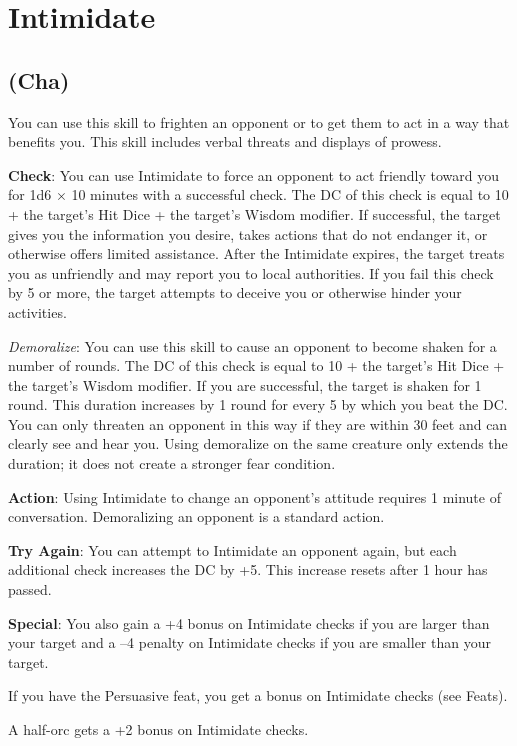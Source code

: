 \section{Intimidate}

\label{f0}
\subsection{(Cha)}

				
You can use this skill to frighten an opponent or to get them to act in a way that benefits you. This skill includes verbal threats and displays of prowess.
				
\textbf{Check}: You can use Intimidate to force an opponent to act friendly toward you for 1d6 \mbox{$\times$} 10 minutes with a successful check. The DC of this check is equal to 10 + the target's Hit Dice + the target's Wisdom modifier. If successful, the target gives you the information you desire, takes actions that do not endanger it, or otherwise offers limited assistance. After the Intimidate expires, the target treats you as unfriendly and may report you to local authorities. If you fail this check by 5 or more, the target attempts to deceive you or otherwise hinder your activities.
				
\emph{Demoralize}: You can use this skill to cause an opponent to become shaken for a number of rounds. The DC of this check is equal to 10 + the target's Hit Dice + the target's Wisdom modifier. If you are successful, the target is shaken for 1 round. This duration increases by 1 round for every 5 by which you beat the DC. You can only threaten an opponent in this way if they are within 30 feet and can clearly see and hear you. Using demoralize on the same creature only extends the duration; it does not create a stronger fear condition.
				
\textbf{Action}: Using Intimidate to change an opponent's attitude requires 1 minute of conversation. Demoralizing an opponent is a standard action.
				
\textbf{Try Again}: You can attempt to Intimidate an opponent again, but each additional check increases the DC by +5. This increase resets after 1 hour has passed.
				
\textbf{Special}: You also gain a +4 bonus on Intimidate checks if you are larger than your target and a --4 penalty on Intimidate checks if you are smaller than your target.
				
If you have the Persuasive feat, you get a bonus on Intimidate checks (see Feats).
				
A half-orc gets a +2 bonus on Intimidate checks.
        	
